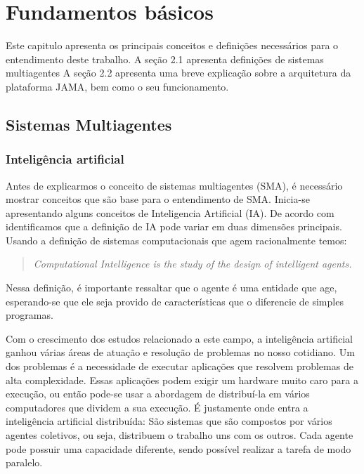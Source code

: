 \chapter{Fundamentos básicos}

Este capitulo apresenta os principais conceitos e definições necessários para o entendimento deste trabalho. A seção 2.1 apresenta definições de sistemas multiagentes
A seção 2.2 apresenta uma breve explicação sobre a arquitetura da plataforma JAMA, bem como o seu funcionamento.

\section{Sistemas Multiagentes}

\subsection{Inteligência artificial}

Antes de explicarmos o conceito de sistemas multiagentes (SMA), é necessário mostrar conceitos que são base para o entendimento de SMA. Inicia-se apresentando alguns conceitos de Inteligencia Artificial (IA). De acordo com~\cite{poole98} identificamos que a definição de IA pode variar em duas dimensões principais. Usando a definição de sistemas computacionais que agem racionalmente temos:

\begin{quote}
\emph{Computational Intelligence is the study of the design of intelligent agents.}
\end{quote}

Nessa definição, é importante ressaltar que o agente é uma entidade que age, esperando-se que ele seja provido de características que o diferencie de simples programas.

Com o crescimento dos estudos relacionado a este campo, a inteligência artificial ganhou várias áreas de atuação e resolução de problemas no nosso cotidiano. Um dos problemas é a necessidade de executar aplicações que resolvem problemas de alta complexidade. Essas aplicações podem exigir um hardware muito caro para a execução, ou então pode-se usar a abordagem de distribuí-la em vários computadores que dividem a sua execução. É justamente onde entra a inteligência artificial distribuída: São sistemas que são compostos por vários agentes coletivos, ou seja, distribuem o trabalho uns com os outros. Cada agente pode possuir uma capacidade diferente, sendo possível realizar a tarefa de modo paralelo. 

